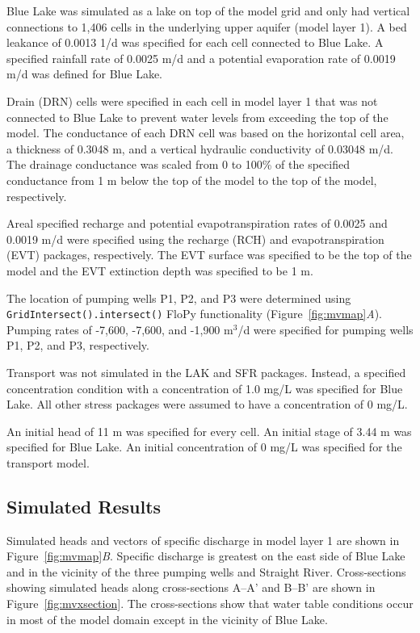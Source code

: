 \documentclass[11pt, oneside]{article}  	%
\begin{document}
Blue Lake was simulated as a lake on top of the model grid and only had vertical connections to 1,406 cells in the underlying upper aquifer (model layer 1). A bed leakance of 0.0013 1/d was specified for each cell connected to Blue Lake. A specified rainfall rate of 0.0025 m/d and a potential evaporation rate of 0.0019 m/d was defined for Blue Lake.

Drain (DRN) cells were specified in each cell in model layer 1 that was not connected to Blue Lake to prevent water levels from exceeding the top of the model. The conductance of each DRN cell was based on the horizontal cell area, a thickness of 0.3048 m, and a vertical hydraulic conductivity of 0.03048 m/d. The drainage conductance was scaled from 0 to 100\% of the specified conductance from 1 m below the top of the model to the top of the model, respectively.

Areal specified recharge and potential evapotranspiration rates of 0.0025 and 0.0019 m/d were specified using the recharge (RCH) and evapotranspiration (EVT) packages, respectively. The EVT surface was specified to be the top of the model and the EVT extinction depth was specified to be 1 m.

The location of pumping wells P1, P2, and P3 were determined using \texttt{GridIntersect().intersect()} FloPy functionality (Figure~\ref{fig:mvmap}\textit{A}). Pumping rates of -7,600, -7,600, and -1,900 m$^3$/d were specified for pumping wells P1, P2, and P3, respectively.

Transport was not simulated in the LAK and SFR packages. Instead, a specified concentration condition with a concentration of 1.0 mg/L was specified for Blue Lake. All other stress packages were assumed to have a concentration of 0 mg/L.

An initial head of 11 m was specified for every cell. An initial stage of 3.44 m was specified for Blue Lake. An initial concentration of 0 mg/L was specified for the transport model.

\subsection{Simulated Results}

Simulated heads and vectors of specific discharge in model layer 1 are shown in Figure~\ref{fig:mvmap}\textit{B}.  Specific discharge is greatest on the east side of Blue Lake and in the vicinity of the three pumping wells and Straight River. Cross-sections showing simulated heads along cross-sections A--A' and B--B' are shown in Figure~\ref{fig:mvxsection}. The cross-sections show that water table conditions occur in most of the model domain except in the vicinity of Blue Lake.
\end{document}
